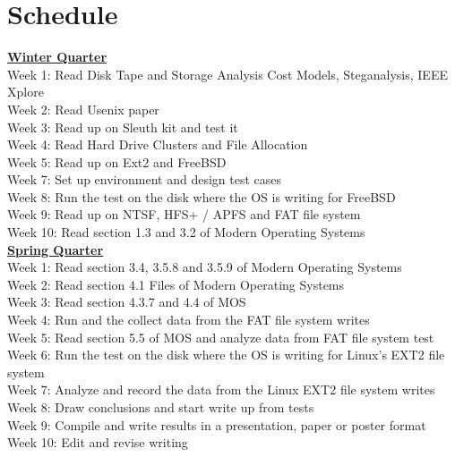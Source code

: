 \documentclass[a4paper]{article}
\begin{document}
\section{Schedule}
\textbf{\underline{Winter Quarter}}\\
Week 1: Read Disk Tape and Storage Analysis Cost Models, Steganalysis, IEEE Xplore\\
Week 2: Read Usenix paper\\
Week 3: Read up on Sleuth kit and test it\\
Week 4: Read Hard Drive Clusters and File Allocation\\
Week 5: Read up on Ext2 and FreeBSD\\
Week 7: Set up environment and design test cases\\
Week 8: Run the test on the disk where the OS is writing for FreeBSD\\
Week 9: Read up on NTSF, HFS+ / APFS and FAT file system\\
Week 10: Read section 1.3 and 3.2 of Modern Operating Systems\\
\newline
\newline
\newline 
\textbf{\underline{Spring Quarter}}\\
Week 1: Read section 3.4, 3.5.8 and 3.5.9 of Modern Operating Systems\\
Week 2: Read section 4.1 Files of Modern Operating Systems\\
Week 3: Read section 4.3.7 and 4.4 of MOS\\
Week 4: Run and the collect data from the FAT file system writes\\
Week 5: Read section 5.5 of MOS and analyze data from FAT file system test\\
Week 6: Run the test on the disk where the OS is writing for Linux’s EXT2 file system\\
Week 7: Analyze and record the data from the Linux EXT2 file system writes\\
Week 8: Draw conclusions and start write up from tests\\
Week 9: Compile and write results in a presentation, paper or poster format\\
Week 10: Edit and revise writing\\
\end{document}
